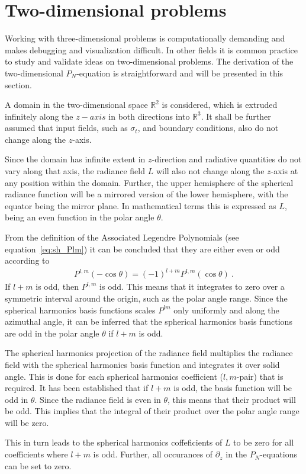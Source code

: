 \section{Two-dimensional problems}
\label{sec:pn_2d}

Working with three-dimensional problems is computationally demanding and makes debugging and visualization difficult. In other fields it is common practice to study and validate ideas on two-dimensional problems. The derivation of the two-dimensional $P_N$-equation is straightforward and will be presented in this section.

A domain in the two-dimensional space $\mathbb{R}^2$ is considered, which is extruded infinitely along the $z-axis$ in both directions into $\mathbb{R}^3$. It shall be further assumed that input fields, such as $\sigma_t$, and boundary conditions, also do not change along the $z$-axis.

Since the domain has infinite extent in $z$-direction and radiative quantities do not vary along that axis, the radiance field $L$ will also not change along the $z$-axis at any position within the domain. Further, the upper hemisphere of the spherical radiance function will be a mirrored version of the lower hemisphere, with the equator being the mirror plane. In mathematical terms this is expressed as $L$, being an even function in the polar angle $\theta$.

From the definition of the Associated Legendre Polynomials (see equation~\ref{eq:sh_Plm}) it can be concluded that they are either even or odd according to
\begin{align}
P^{l,m}\left(-\operatorname{cos}\theta\right) = 
\left(-1\right)^{l+m}
P^{l,m}\left(\operatorname{cos}\theta\right)
\ .
\end{align}
If $l+m$ is odd, then $P^{l,m}$ is odd. This means that it integrates to zero over a symmetric interval around the origin, such as the polar angle range. Since the spherical harmonics basis functions scales $P^{lm}$ only uniformly and along the azimuthal angle, it can be inferred that the spherical harmonics basis functions are odd in the polar angle $\theta$ if $l+m$ is odd.

The spherical harmonics projection of the radiance field multiplies the radiance field with the spherical harmonics basis function and integrates it over solid angle. This is done for each spherical harmonics coefficient ($l,m$-pair) that is required. It has been established that if $l+m$ is odd, the basis function will be odd in $\theta$. Since the radiance field is even in $\theta$, this means that their product will be odd. This implies that the integral of their product over the polar angle range will be zero.

This in turn leads to the spherical harmonics coffeficients of $L$ to be zero for all coefficients where $l+m$ is odd. Further, all occurances of $\partial_z$ in the $P_N$-equations can be set to zero.

